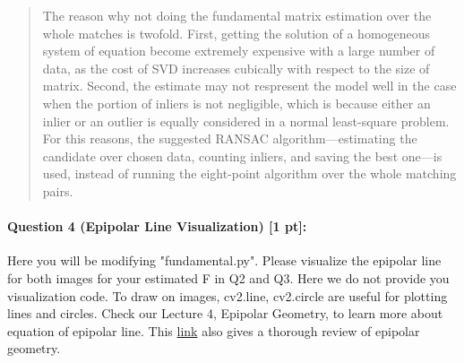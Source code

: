 \documentclass[11pt]{article}
\begin{document}
\begin{quote}
The reason why not doing the fundamental matrix estimation over the whole matches is twofold. First, getting the solution of a homogeneous system of equation become extremely expensive with a large number of data, as the cost of SVD increases cubically with respect to the size of matrix. Second, the estimate may not respresent the model well in the case when the portion of inliers is not negligible, which is because either an inlier or an outlier is equally considered in a normal least-square problem. For this reasons, the suggested RANSAC algorithm---estimating the candidate over chosen data, counting inliers, and saving the best one---is used, instead of running the eight-point algorithm over the whole matching pairs.

\end{quote}

\paragraph{Question 4 (Epipolar Line Visualization) [1 pt]:} Here you will be modifying "fundamental.py". Please visualize the epipolar line for both images for your estimated F in Q2 and Q3. Here we do not provide you visualization code. To draw on images, cv2.line, cv2.circle are useful for plotting lines and circles. Check our Lecture 4, Epipolar Geometry, to learn more about equation of epipolar line. This \href{https://web.stanford.edu/class/cs231a/course_notes/03-epipolar-geometry.pdf}{link} also gives a thorough review of epipolar geometry.
\end{document}
